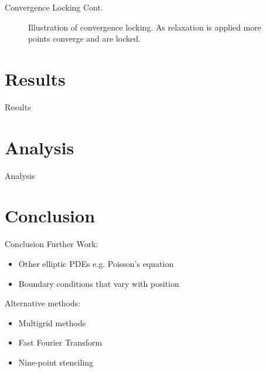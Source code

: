 \documentclass{beamer}
\begin{document}
\begin{frame}{Convergence Locking Cont.}
\begin{figure}
\centering
{}
\caption{Illustration of convergence locking. As relaxation is applied more points converge and are locked.}
\end{figure}

\end{frame}

\section{Results}

\begin{frame}{Results}
\end{frame}

\section{Analysis}
\begin{frame}{Analysis}
\end{frame}

\section{Conclusion}

\begin{frame}{Conclusion}
Further Work:
\begin{itemize}
\item Other elliptic PDEs e.g. Poisson's equation
\item Boundary conditions that vary with position
\end{itemize}

Alternative methods:
\begin{itemize}
\item Multigrid methods
\item Fast Fourier Transform
\item Nine-point stenciling
\end{itemize}

\end{frame}

\begin{frame}
\titlepage
\end{frame}
\end{document}
